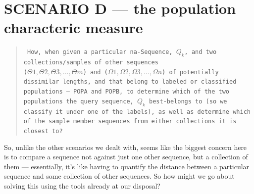 \documentclass[a4paper, 18pt]{book} %
\begin{document}
\section{SCENARIO D --- the population characteric measure}
\label{SECSCEND}

\begin{quote}
\small
\texttt{
How, when given a particular na-Sequence, $Q_k$, and two collections/samples of other sequences\\
 ($\Theta1, \Theta2, \Theta3,..., \Theta m$) and ($\Omega1, \Omega2, \Omega3,..., \Omega n$) of potentially dissimilar lengths, and that belong to labeled or classified populations --- POPA and POPB, to determine which of the two populations the query sequence, $Q_k$ best-belongs to (so we classify it under one of the labels), as well as determine which of the sample member sequences from either collections it is closest to?}
\end{quote}


So, unlike the other scenarios we dealt with, seems like the biggest concern here is to compare a sequence not against just one other sequence, but a collection of them --- essentially, it's like having to quantify the distance between a particular sequence and some collection of other sequences. So how might we go about solving this using the tools already at our disposal?


\begin{center}
\\
\end{center}
\end{document}
